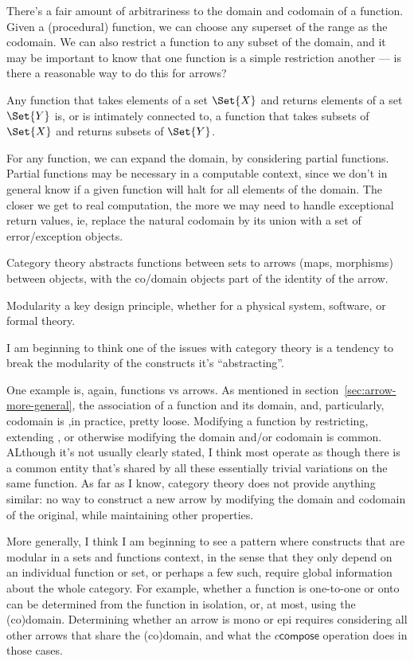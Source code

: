 \documentclass[11pt,openany]{article}
\begin{document}
There's a fair amount of arbitrariness 
to the domain and codomain of a function.
Given a (procedural) function,
we can choose any superset of the range as the codomain.
We can also restrict a function to any subset of the domain,
and it may be important to know that one function is a simple 
restriction another --- is there a reasonable way to do this
for arrows?

Any function that takes elements of a set $\Set{X}$
and returns elements of a set $\Set{Y}$
is, or is intimately connected to, 
a function that takes subsets of $\Set{X}$ and returns
subsets of $\Set{Y}$.

For any function, we can expand the domain, by considering partial
functions. 
Partial functions may be necessary in a computable context,
since we don't in general know if a given function will
halt for all elements of the domain.
The closer we get to real computation, the more we may need to
handle exceptional return values, ie, replace the natural
codomain by its union with a set of error/exception objects.

Category theory abstracts functions between sets to
arrows (maps, morphisms) between objects,
with the co/domain objects part of the identity of the arrow.

\label{sec:Modularity_breaking}

Modularity a key design principle, whether for
a physical system, software, or formal theory.

I am beginning to think one of the issues with category theory
is a tendency to break the modularity of the constructs it's
``abstracting''.

One example is, again, functions vs arrows.
As mentioned in section~\ref{sec:arrow-more-general},
the association of a function and its domain, and, particularly,
codomain is ,in practice, pretty loose.
Modifying a function by restricting, extending , or otherwise
modifying the domain and/or codomain is common.
ALthough it's not usually clearly stated, 
I think most operate as though there is a common entity
that's shared by all these essentially trivial variations on the
same function.
As far as I know, category theory does not provide anything similar:
no way to construct a new arrow by modifying the domain
and codomain of the original, while maintaining other properties.

More generally, I think I am beginning to see a pattern where
constructs that are modular in a sets and functions context,
in the sense that they only depend on an individual function or
set, or perhaps a few such, require global information about
the whole category.
For example, whether a function is one-to-one or onto
can be determined from the function in isolation,
or, at most, using the (co)domain.
Determining whether an arrow is mono or epi requires
considering all other arrows that share the (co)domain,
and what the $c\mathsf{compose}$ operation does in those cases.
\label{sec:Right-abstraction}
\end{document}
